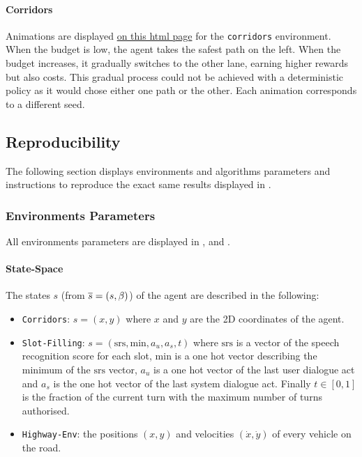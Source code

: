 

\paragraph{Corridors}

Animations are displayed  \href{https://github.com/budgeted-rl/budgeted-rl.github.io\#optimal-budgeted-policies-learnt-with-a-risk-sensitive-exploration}{on this html page} for the \texttt{corridors} environment. When the budget is low, the agent takes the safest path on the left. When the budget increases, it gradually switches to the other lane, earning higher rewards but also costs. This gradual process could not be achieved with a deterministic policy as it would chose either one path or the other. Each animation corresponds to a different seed.

\subsection{Reproducibility}
\label{subsec:reproducibility-supp}

The following section displays environments and algorithms parameters and instructions to reproduce the exact same results displayed in .

\subsubsection{Environments Parameters}
\label{sec:env-parameters}

All environments parameters are displayed in ,  and .


\paragraph{State-Space}

The states $s$ (from $\overline{s}=(s,\beta)$) of the agent are described in the following:

\begin{itemize}
    \item \texttt{Corridors}: $s = (x,y)$ where $x$ and $y$ are the 2D coordinates of the agent.
    \item \texttt{Slot-Filling}: $s = (\text{srs},\text{min},a_u,a_s,t)$ where $\text{srs}$ is a vector of the speech recognition score for each slot, $\text{min}$ is a one hot vector describing the minimum of the $\text{srs}$ vector, $a_u$ is a one hot vector of the last user dialogue act and $a_s$ is the one hot vector of the last system dialogue act. Finally $t\in[0,1]$ is the fraction of the current turn with the maximum number of turns authorised.
    \item \texttt{Highway-Env}: the positions $(x, y)$ and velocities $(\dot{x}, \dot{y})$ of every vehicle on the road.
\end{itemize}


